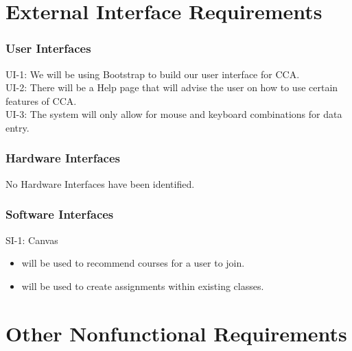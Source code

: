\documentclass{scrreprt}
\begin{document}
\chapter{External Interface Requirements}
\subsection{User Interfaces}
UI-1: We will be using Bootstrap to build our user interface for CCA.\\
UI-2: There will be a Help page that will advise the user on how to use certain features of CCA.\\
UI-3: The system will only allow for mouse and keyboard combinations for data entry.\\

\subsection{Hardware Interfaces}
No Hardware Interfaces have been identified.\\

\subsection{Software Interfaces}
SI-1: Canvas
\begin{itemize}
\item will be used to recommend courses for a user to join.
\item will be used to create assignments within existing classes.
\end{itemize}
\chapter{Other Nonfunctional Requirements}
\end{document}
